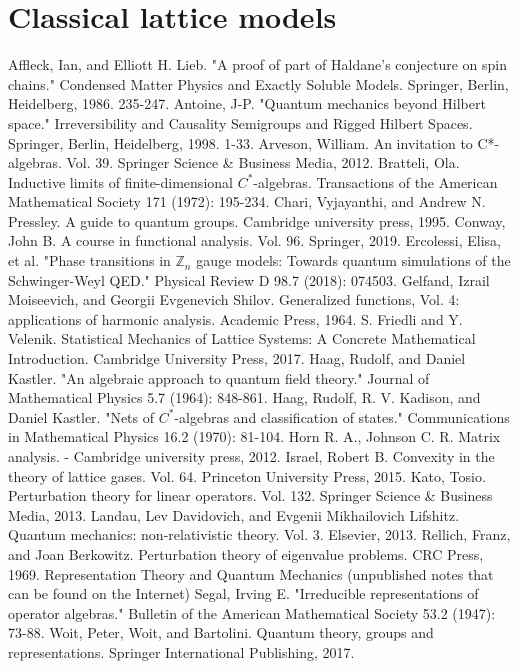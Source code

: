\documentclass[11pt]{article}%
\theoremstyle{definition}
\theoremstyle{definition}
\theoremstyle{definition}\newtheorem{definition}{Definition}
\theoremstyle{definition} \newtheorem{cntex}{Counterexample}
\theoremstyle{definition}\newtheorem*{acknowledgement}{Acknowledgement}
\theoremstyle{definition}\newtheorem{remark}{Remark}
\theoremstyle{definition}\newtheorem{quest}{Question}
\numberwithin{equation}{section}
\begin{document}
\tableofcontents


\section{Classical lattice models}









\begin{thebibliography}{15}
 Affleck, Ian, and Elliott H. Lieb. "A proof of part of Haldane's conjecture on spin chains." Condensed Matter Physics and Exactly Soluble Models. Springer, Berlin, Heidelberg, 1986. 235-247.
 Antoine, J-P. "Quantum mechanics beyond Hilbert space." Irreversibility and Causality Semigroups and Rigged Hilbert Spaces. Springer, Berlin, Heidelberg, 1998. 1-33.
 Arveson, William. An invitation to C*-algebras. Vol. 39. Springer Science \& Business Media, 2012.
 Bratteli, Ola. Inductive limits of finite-dimensional $C^*$-algebras. Transactions of the American Mathematical Society 171 (1972): 195-234.\label{bratteli}
 Chari, Vyjayanthi, and Andrew N. Pressley. A guide to quantum groups. Cambridge university press, 1995.
 Conway, John B. A course in functional analysis. Vol. 96. Springer, 2019.
 Ercolessi, Elisa, et al. "Phase transitions in $\mathbb Z_n$ gauge models: Towards quantum simulations of the Schwinger-Weyl QED." Physical Review D 98.7 (2018): 074503.
 Gelfand, Izrail Moiseevich, and Georgii Evgenevich Shilov. Generalized functions, Vol. 4: applications of harmonic analysis. Academic Press, 1964.
 S. Friedli and Y. Velenik. Statistical Mechanics of Lattice Systems: A Concrete Mathematical Introduction. Cambridge University Press, 2017.
 Haag, Rudolf, and Daniel Kastler. "An algebraic approach to quantum field theory." Journal of Mathematical Physics 5.7 (1964): 848-861.
 Haag, Rudolf, R. V. Kadison, and Daniel Kastler. "Nets of $C^*$-algebras and classification of states." Communications in Mathematical Physics 16.2 (1970): 81-104.
 Horn R. A., Johnson C. R. Matrix analysis. - Cambridge university press, 2012.
 Israel, Robert B. Convexity in the theory of lattice gases. Vol. 64. Princeton University Press, 2015.
 Kato, Tosio. Perturbation theory for linear operators. Vol. 132. Springer Science \& Business Media, 2013.
 Landau, Lev Davidovich, and Evgenii Mikhailovich Lifshitz. Quantum mechanics: non-relativistic theory. Vol. 3. Elsevier, 2013.
 Rellich, Franz, and Joan Berkowitz. Perturbation theory of eigenvalue problems. CRC Press, 1969.
 Representation Theory and Quantum Mechanics (unpublished notes that can be found on the Internet)
 Segal, Irving E. "Irreducible representations of operator algebras." Bulletin of the American Mathematical Society 53.2 (1947): 73-88.
 Woit, Peter, Woit, and Bartolini. Quantum theory, groups and representations. Springer International Publishing, 2017.
\end{thebibliography}
\end{document}
